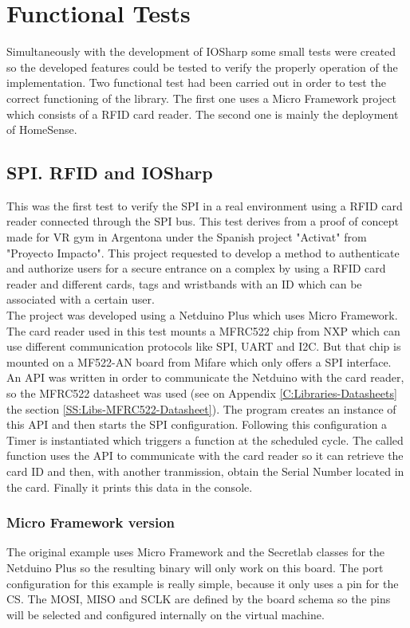 \chapter{Functional Tests}\label{C:Functional-Tests}
Simultaneously with the development of IOSharp some small tests were created so the developed features could be tested to verify the properly operation of the implementation. Two functional test had been carried out in order to test the correct functioning of the library. The first one uses a Micro Framework project which consists of a RFID card reader. The second one is mainly the deployment of HomeSense.

\section{SPI. RFID and IOSharp}\label{S:rfid-iosharp}
This was the first test to verify the SPI in a real environment using a RFID card reader connected through the SPI bus. This test derives from a proof of concept made for VR gym in Argentona under the Spanish project "Activat" from "Proyecto Impacto". This project requested to develop a method to authenticate and authorize users for a secure entrance on a complex by using a RFID card reader and different cards, tags and wristbands with an ID which can be associated with a certain user.
\\
The project was developed using a Netduino Plus which uses Micro Framework. The card reader used in this test mounts a MFRC522 chip from NXP which can use different communication protocols like SPI, UART and \gls{I2C}. But that chip is mounted on a MF522-AN board from Mifare which only offers a SPI interface.
\\
An API was written in order to communicate the Netduino with the card reader, so the MFRC522 datasheet was used (see on Appendix \ref{C:Libraries-Datasheets} the section \ref{SS:Libs-MFRC522-Datasheet}). The program creates an instance of this API and then starts the SPI configuration. Following this configuration a Timer is instantiated which triggers a function at the scheduled cycle. The called function uses the API to communicate with the card reader so it can retrieve the card ID and then, with another tranmission, obtain the Serial Number located in the card. Finally it prints this data in the console.

\subsection{Micro Framework version}\label{S:IOEx-SPI-Netduino}
The original example uses Micro Framework and the Secretlab classes for the Netduino Plus so the resulting binary will only work on this board. The port configuration for this example is really simple, because it only uses a pin for the \gls{CS}. The \gls{MOSI}, \gls{MISO} and \gls{SCLK} are defined by the board schema so the pins will be selected and configured internally on the virtual machine.

